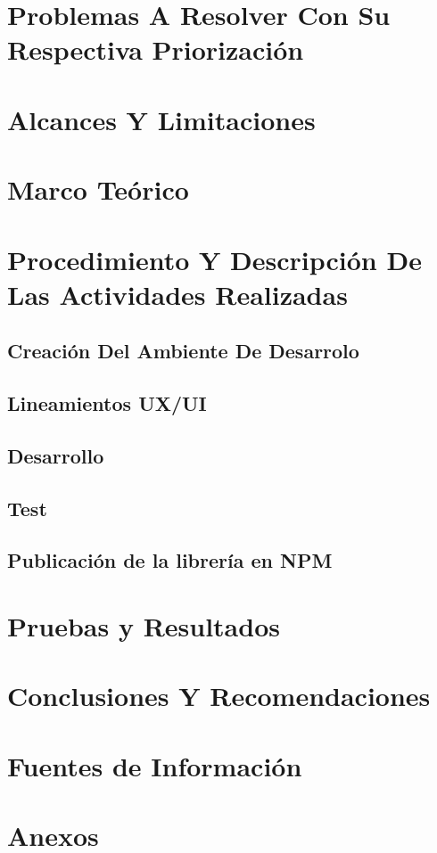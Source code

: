 \documentclass[a4paper,12pt, listof=totoc]{report}
\begin{document}
		\chapter {Problemas A Resolver Con Su Respectiva Priorización }
			
			
		\chapter {Alcances Y Limitaciones }
				
		
		\chapter {Marco Teórico  }
			
		
		\chapter {Procedimiento Y Descripción De Las Actividades Realizadas}
			
			
			\section {Creación Del Ambiente De Desarrolo}
				
				
			\section {Lineamientos UX/UI}
				
				
			\section {Desarrollo}
				
				
			\section {Test }
				
				
			\section {Publicación de la librería en NPM }
				
			
		
		\chapter {Pruebas y Resultados}
			
		
		\chapter {Conclusiones Y Recomendaciones}
			
		
		\chapter {Fuentes de Información}
			
			
		\chapter {Anexos}
\end{document}
